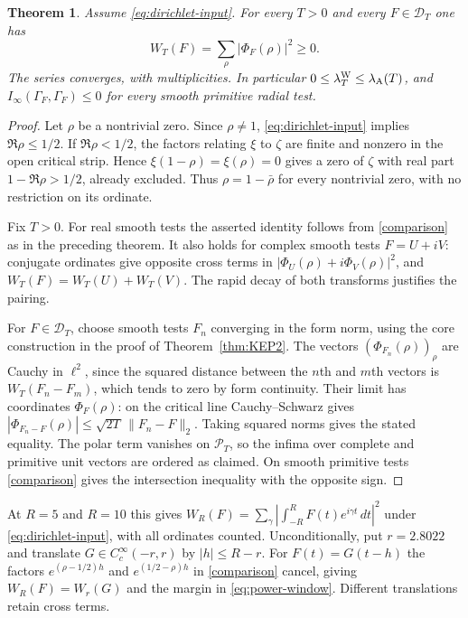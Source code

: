 \documentclass[11pt]{amsart}
\newtheorem{theorem}{Theorem}[section]
\theoremstyle{definition}
\theoremstyle{remark}
\begin{document}
\begin{theorem}\label{thm:all-support}
Assume \eqref{eq:dirichlet-input}. For every $T>0$ and every $F\in\mathcal D_T$ one has
\[
 W_T(F)=\sum_{\rho}|\Phi_F(\rho)|^2\ge0 .
\]
The series converges, with multiplicities. In particular
$0\le\lambda^{\rm W}_T\le\lambda_{\rm A}(T)$, and
$I_\infty(\Gamma_F,\Gamma_F)\le0$ for every smooth primitive radial test.
\end{theorem}
\begin{proof}
Let $\rho$ be a nontrivial zero. Since $\rho\ne1$,
\eqref{eq:dirichlet-input} implies $\Re\rho\le1/2$. If $\Re\rho<1/2$, the factors relating $\xi$ to
$\zeta$ are finite and nonzero in the open critical strip. Hence
$\xi(1-\rho)=\xi(\rho)=0$ gives a zero of $\zeta$ with real part
$1-\Re\rho>1/2$, already excluded. Thus $\rho=1-\bar\rho$ for every
nontrivial zero, with no restriction on its ordinate.

Fix $T>0$. For real smooth tests the asserted identity follows from
\eqref{comparison} as in the preceding theorem. It also holds for complex
smooth tests $F=U+iV$: conjugate ordinates give opposite cross terms in
$|\Phi_U(\rho)+i\Phi_V(\rho)|^2$, and $W_T(F)=W_T(U)+W_T(V)$.
The rapid decay of both transforms justifies the pairing.

For $F\in\mathcal D_T$, choose smooth tests $F_n$ converging in the form
norm, using the core construction in the proof of Theorem~\ref{thm:KEP2}.
The vectors $(\Phi_{F_n}(\rho))_\rho$ are Cauchy in $\ell^2$, since the
squared distance between the $n$th and $m$th vectors is $W_T(F_n-F_m)$,
which tends to zero by form continuity. Their limit has coordinates
$\Phi_F(\rho)$: on the critical line Cauchy--Schwarz gives
$|\Phi_{F_n-F}(\rho)|\le\sqrt{2T}\,\|F_n-F\|_2$. Taking squared norms
gives the stated equality. The polar term vanishes on $\mathcal P_T$,
so the infima over complete and primitive unit vectors are ordered as
claimed. On smooth primitive tests \eqref{comparison} gives the
intersection inequality with the opposite sign.
\end{proof}

At $R=5$ and $R=10$ this gives
$W_R(F)=\sum_\gamma|\int_{-R}^RF(t)e^{i\gamma t}\,dt|^2$
under \eqref{eq:dirichlet-input}, with all ordinates counted.
Unconditionally, put $r=2.8022$ and translate $G\in C_c^\infty(-r,r)$
by $|h|\le R-r$. For $F(t)=G(t-h)$ the factors
$e^{(\rho-1/2)h}$ and $e^{(1/2-\rho)h}$ in \eqref{comparison}
cancel, giving $W_R(F)=W_r(G)$ and the margin in
\eqref{eq:power-window}. Different translations retain cross terms.
\end{document}
